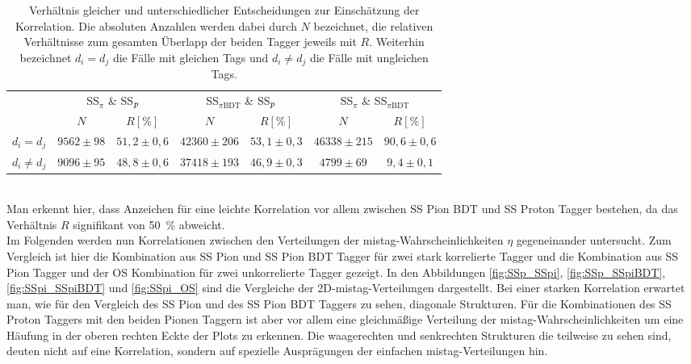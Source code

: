 \begin{table}[htbp]
	\centering
	\small
	\caption{Verhältnis gleicher und unterschiedlicher Entscheidungen zur Einschätzung der Korrelation. Die absoluten Anzahlen werden dabei durch $N$ bezeichnet, die relativen Verhältnisse zum gesamten Überlapp der beiden Tagger jeweils mit $R$. Weiterhin bezeichnet $d_i=d_j$ die Fälle mit gleichen Tags und $d_i\neq d_j$ die Fälle mit ungleichen Tags.}
	\label{tab:overlap}
	\begin{tabular}{ccccccc}
	\toprule
         			& \multicolumn{2}{c}{SS$_\pi$ \& SS$_{p}$} & \multicolumn{2}{c}{SS$_{\pi\text{BDT}}$ \& SS$_{p}$} & \multicolumn{2}{c}{SS$_\pi$ \& SS$_{\pi\text{BDT}}$} \\  
        				& $N$ & $R \si{ [\percent]}$ & $N$ & $R \si{ [\percent]}$ & $N$ & $R \si{ [\percent]}$ \\ 
				\midrule
       $d_i=d_j$	& $9562\pm98$ & $51{,}2\pm0{,}6$ & $42360\pm206$ & $53{,}1\pm0{,}3$ &  $46338\pm215$  & $90{,}6\pm0{,}6$ \\ 
        $d_i\neq d_j$  & $9096\pm95$ & $48{,}8\pm0{,}6$ & $37418\pm193$ & $46{,}9\pm0{,}3$ & $4799\pm69$  & $9{,}4\pm0{,}1$ \\ 
        \bottomrule
	\end{tabular}
\end{table}\\
Man erkennt hier, dass Anzeichen für eine leichte Korrelation vor allem zwischen SS Pion BDT und SS Proton Tagger bestehen, da das Verhältnis $R$ signifikant von \SI{50}{\%} abweicht.\\
Im Folgenden werden nun Korrelationen zwischen den Verteilungen der mistag-Wahrscheinlichkeiten $\eta$ gegeneinander untersucht. Zum Vergleich ist hier  die Kombination aus SS Pion und SS Pion BDT Tagger für zwei stark korrelierte Tagger und die Kombination aus SS Pion Tagger und der OS Kombination für zwei unkorrelierte Tagger gezeigt. In den Abbildungen \ref{fig:SSp_SSpi}, \ref{fig:SSp_SSpiBDT}, \ref{fig:SSpi_SSpiBDT} und \ref{fig:SSpi_OS} sind die Vergleiche der 2D-mistag-Verteilungen dargestellt. Bei einer starken Korrelation erwartet man, wie für den Vergleich des SS Pion und des SS Pion BDT Taggers zu sehen, diagonale Strukturen. Für die Kombinationen des SS Proton Taggers mit den beiden Pionen Taggern ist aber vor allem eine gleichmäßige Verteilung der mistag-Wahrscheinlichkeiten um eine Häufung in der oberen rechten Eckte der Plots zu erkennen. Die waagerechten und senkrechten Strukturen die teilweise zu sehen sind, deuten nicht auf eine Korrelation, sondern auf spezielle Ausprägungen der einfachen mistag-Verteilungen hin.
